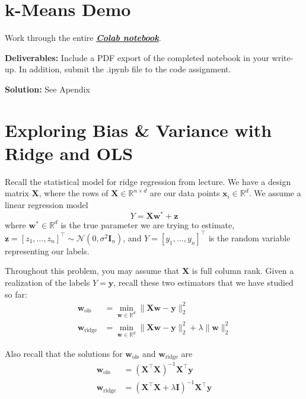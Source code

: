 \documentclass{article}
\newcommand{\Question}[1]{\Large \section{ #1 } \normalsize}
\newcommand{\mat}[1]{\mathbf{#1}}
\renewcommand{\vec}[1]{\boldsymbol{\mathbf{#1}}}
\newenvironment{solution}{\color{blue} \smallskip \textbf{Solution:}}{}
\begin{document}
\fontsize{12}{15}\selectfont

\Question{k-Means Demo}

Work through the entire
\href{https://drive.google.com/file/d/1RvCBdIIZUk-Z9E3dRXBHsixfSNhdPfWC/view?usp=drive_link}{\textbf{\emph{Colab notebook}}}.

\textbf{Deliverables:} Include a PDF export of the completed notebook in your write-up. In addition, submit the .ipynb file to the code assignment.

\begin{solution}
See Apendix 
\end{solution}


\newpage
\Question{Exploring Bias \& Variance with Ridge and OLS}

Recall the statistical model for ridge regression from lecture. We have a design matrix $\mat{X}$, where the rows of $\mat{X}\in\mathbb{R}^{n\times d}$ are our data points $\vec{x}_i\in\mathbb{R}^d$. We assume a linear regression model
\[Y = \mat{X}\vec{w}^* + \vec{z}\]
where $\vec{w}^*\in\mathbb{R}^d$ is the true parameter we are trying to estimate, $\vec{z}=[z_1, \ldots, z_n]^\top \sim\mathcal{N}(0,\sigma^2\mat{I}_n)$, and $Y = [y_1, \ldots, y_n]^\top$ is the random variable representing our labels.

Throughout this problem, you may assume that $\mat{X}$ is full column rank. Given a realization of the labels $Y=\vec{y}$, recall these two estimators that we have studied so far:
\begin{align*}
    \vec{w}_{\text{ols}} &= \min_{\vec{w} \in \mathbb{R}^d} \|\mat{X}\vec{w} - \vec{y}\|_2^2\\
    \vec{w}_{\text{ridge}} &= \min_{\vec{w} \in \mathbb{R}^d} \|\mat{X}\vec{w} - \vec{y}\|_2^2 + \lambda \|\vec{w}\|_2^2
\end{align*}

Also recall that the solutions for $\vec{w}_{\text{ols}}$ and $\vec{w}_{\text{ridge}}$ are
\begin{align*}
    \vec{w}_{\text{ols}} &= (\mat{X}^\top\mat{X})^{-1}\mat{X}^\top\vec{y} \\
    \vec{w}_{\text{ridge}} &= (\mat{X}^\top\mat{X} + \lambda \mat{I})^{-1}\mat{X}^\top\vec{y}
\end{align*}
\end{document}
